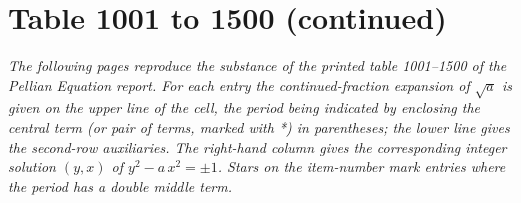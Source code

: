 \documentclass[11pt]{article}
\begin{document}
\setcounter{page}{450}

%
%

\section*{Table 1001 to 1500 (continued)}

\noindent\textit{The following pages reproduce the substance of the printed table 1001--1500 of the Pellian Equation report.  For each entry the continued-fraction expansion of $\sqrt{a}$ is given on the upper line of the cell, the period being indicated by enclosing the central term (or pair of terms, marked with *) in parentheses; the lower line gives the second-row auxiliaries.  The right-hand column gives the corresponding integer solution $(y,x)$ of $y^{2}-a\,x^{2}=\pm 1$. Stars on the item-number mark entries where the period has a double middle term.}

\bigskip
\end{document}
